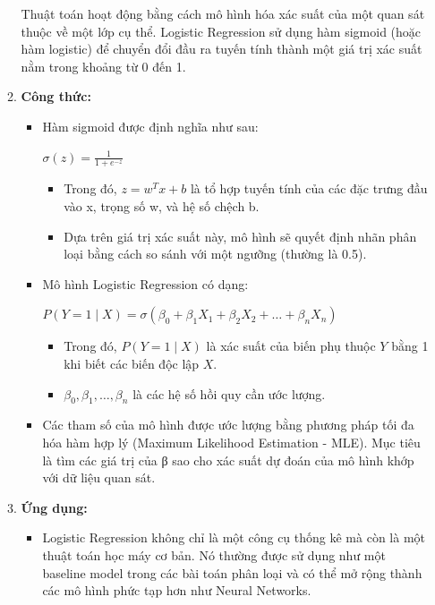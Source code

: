 \documentclass[13pt]{article}
\begin{document}
\begin{enumerate}
\begin{enumerate}
    Thuật toán hoạt động bằng cách mô hình hóa xác suất của một quan sát thuộc về một lớp cụ thể. Logistic Regression sử dụng hàm sigmoid (hoặc hàm logistic) để chuyển đổi đầu ra tuyến tính thành một giá trị xác suất nằm trong khoảng từ 0 đến 1. 
        \item \textbf{Công thức: }
        \begin{itemize}
        \item Hàm sigmoid được định nghĩa như sau:
        \begin{center}
            $ \sigma(z) = \frac{1}{1 + e^{-z}} $
        \end{center}
        \begin{itemize}
            \item Trong đó, $ z=w^Tx+b $ là tổ hợp tuyến tính của các đặc trưng đầu vào x, trọng số w, và hệ số chệch b.
            \item Dựa trên giá trị xác suất này, mô hình sẽ quyết định nhãn phân loại bằng cách so sánh với một ngưỡng (thường là 0.5).
        \end{itemize}
        \item Mô hình Logistic Regression có dạng:
        \begin{center}
            $ P(Y = 1 \mid X) = \sigma(\beta_0 + \beta_1 X_1 + \beta_2 X_2 + \dots + \beta_n X_n) $
        \end{center}
        \begin{itemize}
            \item Trong đó, $P(Y=1 \mid X)$ là xác suất của biến phụ thuộc $Y$ bằng 1 khi biết các biến độc lập $X$.
            \item $\beta_0, \beta_1, \dots, \beta_n$ là các hệ số hồi quy cần ước lượng.
        \end{itemize}

        \item Các tham số của mô hình được ước lượng bằng phương pháp tối đa hóa hàm hợp lý (Maximum Likelihood Estimation - MLE). Mục tiêu là tìm các giá trị của β sao cho xác suất dự đoán của mô hình khớp với dữ liệu quan sát.
    \end{itemize}
    \item \textbf{Ứng dụng: }
    \begin{itemize}
        \item Logistic Regression không chỉ là một công cụ thống kê mà còn là một thuật toán học máy cơ bản. Nó thường được sử dụng như một baseline model trong các bài toán phân loại và có thể mở rộng thành các mô hình phức tạp hơn như Neural Networks.
    \end{itemize}    
    \end{enumerate}
    

\end{enumerate}
\end{document}
